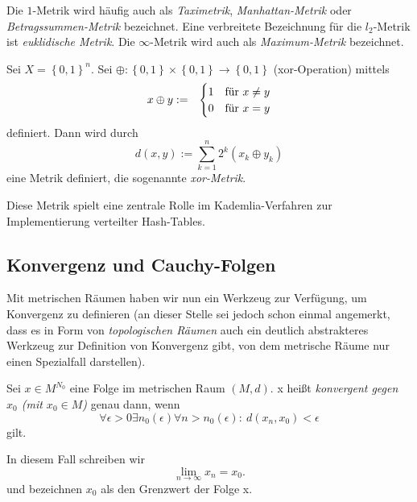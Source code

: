 \documentclass[10pt]{scrbook}
\begin{document}
\begin{Bem}
Die $1$-Metrik wird häufig auch als \emph{Taximetrik}, \emph{Manhattan-Metrik} oder \emph{Betragssummen-Metrik} bezeichnet. Eine verbreitete Bezeichnung für die $l_2$-Metrik ist \emph{euklidische Metrik}. Die $\infty$-Metrik wird auch als \emph{Maximum-Metrik} bezeichnet.
\end{Bem}

\begin{Bsp}
Sei $X=\left\{0, 1\right\}^n$. Sei $\oplus: \left\{0, 1\right\}\times \left\{0, 1\right\}\rightarrow \left\{0, 1\right\}$ (xor-Operation) mittels
\begin{eqnarray*}
x\oplus y & := & 
\begin{cases}
1 & \textnormal{für }x\neq y \\
0 & \textnormal{für }x= y
\end{cases}
\end{eqnarray*} 
definiert.
Dann wird durch
\begin{displaymath}
d(x, y) := \sum_{k=1}^n 2^k \left(x_k\oplus y_k\right)
\end{displaymath}
eine Metrik definiert, die sogenannte \emph{xor-Metrik}.

Diese Metrik spielt eine zentrale Rolle im Kademlia-Verfahren zur Implementierung verteilter Hash-Tables.
\end{Bsp}

\subsection{Konvergenz und Cauchy-Folgen}

Mit metrischen Räumen haben wir nun ein Werkzeug zur Verfügung, um Konvergenz zu definieren (an dieser Stelle sei jedoch schon einmal angemerkt, dass es in Form von \emph{topologischen Räumen} auch ein deutlich abstrakteres Werkzeug zur Definition von Konvergenz gibt, von dem metrische Räume nur einen Spezialfall darstellen).

\begin{Def}
Sei $x\in M^{N_0}$ eine Folge im metrischen Raum $(M, d)$. x heißt \emph{konvergent gegen $x_0$ (mit $x_0\in M$)} genau dann, wenn
\begin{displaymath}
\forall \epsilon > 0 \exists n_0(\epsilon) \forall n>n_0(\epsilon):\ d(x_n, x_0)<\epsilon
\end{displaymath}
gilt.

In diesem Fall schreiben wir
\begin{displaymath}
\lim_{n\rightarrow\infty} x_n = x_0.
\end{displaymath}
und bezeichnen $x_0$ als den Grenzwert der Folge x.
\end{Def}
\end{document}
